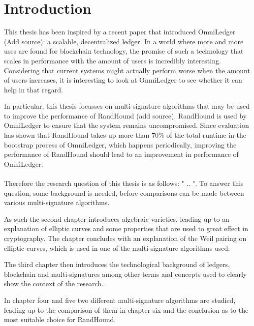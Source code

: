 \documentclass[12pt]{report}
\begin{document}
	\chapter{Introduction}
	This thesis has been inspired by a recent paper that introduced OmniLedger (Add source): a scalable, decentralized ledger. In a world where more and more uses are found for blockchain technology, the promise of such a technology that scales in performance with the amount of users is incredibly interesting. Considering that current systems might actually perform worse when the amount of users increases, it is interesting to look at OmniLedger to see whether it can help in that regard.
	
	In particular, this thesis focusses on multi-signature algorithms that may be used to improve the performance of RandHound (add source). RandHound is used by OmniLedger to ensure that the system remains uncompromised. Since evaluation has shown that RandHound takes up more than 70\% of the total runtime in the bootstrap process of OmniLedger, which happens periodically, improving the performance of RandHound should lead to an improvement in performance of OmniLedger.
	\\
	\\
	Therefore the research question of this thesis is as follows: " .. ". To answer this question, some background is needed, before comparisons can be made between various multi-signature algorithms.
	
	As such the second chapter introduces algebraic varieties, leading up to an explanation of elliptic curves and some properties that are used to great effect in cryptography. The chapter concludes with an explanation of the Weil pairing on elliptic curves, which is used in one of the multi-signature algorithms used.
	
	The third chapter then introduces the technological background of ledgers, blockchain and multi-signatures among other terms and concepts used to clearly show the context of the research.
	
	In chapter four and five two different multi-signature algorithms are studied, leading up to the comparison of them in chapter six and the conclusion as to the most suitable choice for RandHound.
\end{document}
